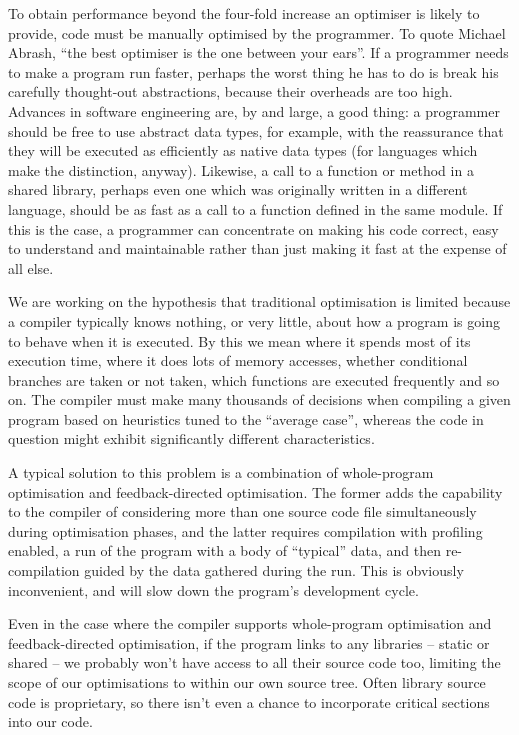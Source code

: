 \documentclass[11pt,letterpaper,onecolumn,notitlepage]{article}
\begin{document}
To obtain performance beyond the four-fold increase an optimiser is likely to provide, code must be manually optimised by the programmer. To quote Michael Abrash, ``the best optimiser is the one between your ears''. If a programmer needs to make a program run faster, perhaps the worst thing he has to do is break his carefully thought-out abstractions, because their overheads are too high. Advances in software engineering are, by and large, a good thing: a programmer should be free to use abstract data types, for example, with the reassurance that they will be executed as efficiently as native data types (for languages which make the distinction, anyway). Likewise, a call to a function or method in a shared library, perhaps even one which was originally written in a different language, should be as fast as a call to a function defined in the same module. If this is the case, a programmer can concentrate on making his code correct, easy to understand and maintainable rather than just making it fast at the expense of all else.

We are working on the hypothesis that traditional optimisation is limited because a compiler typically knows nothing, or very little, about how a program is going to behave when it is executed. By this we mean where it spends most of its execution time, where it does lots of memory accesses, whether conditional branches are taken or not taken, which functions are executed frequently and so on. The compiler must make many thousands of decisions when compiling a given program based on heuristics tuned to the ``average case'', whereas the code in question might exhibit significantly different characteristics.

A typical solution to this problem is a combination of whole-program optimisation and feedback-directed optimisation. The former adds the capability to the compiler of considering more than one source code file simultaneously during optimisation phases, and the latter requires compilation with profiling enabled, a run of the program with a body of ``typical'' data, and then re-compilation guided by the data gathered during the run. This is obviously inconvenient, and will slow down the program's development cycle.

Even in the case where the compiler supports whole-program optimisation and feedback-directed optimisation, if the program links to any libraries -- static or shared -- we probably won't have access to all their source code too, limiting the scope of our optimisations to within our own source tree. Often library source code is proprietary, so there isn't even a chance to incorporate critical sections into our code.
\end{document}
